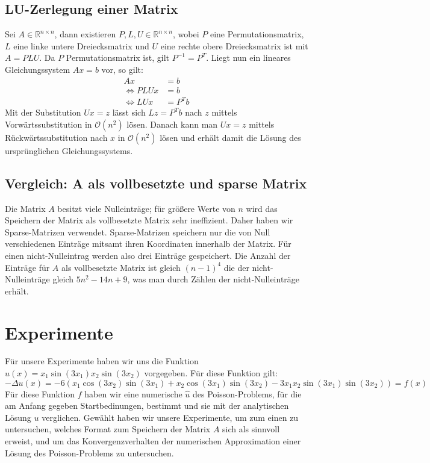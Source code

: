 \documentclass{scrartcl}
\theoremstyle{remark}
\begin{document}
\subsection{LU-Zerlegung einer Matrix}
Sei \(A \in \mathbb{R}^{n \times n}\), dann existieren \(P, L, U \in \mathbb{R}^{n \times n}\), 
wobei \(P\) eine Permutationsmatrix, \(L\) eine linke untere Dreiecksmatrix und \(U\) eine rechte obere
Dreiecksmatrix ist mit \(A = PLU\).  \cite{LU}
Da \(P\) Permutationsmatrix ist, gilt \(P^{-1} = P^T\).
Liegt nun ein lineares Gleichungssystem \(Ax = b\) vor, so gilt:
\begin{align*}
  Ax &= b \\
  \iff PLUx &= b \\
  \iff LUx  &= P^{T}b
\end{align*}
Mit der Substitution \(Ux = z\) lässt sich \(Lz = P^{T}b\) nach \(z\) mittels Vorwärtssubstitution in \(\mathcal{O}(n^{2})\) lösen.
Danach kann man \(Ux = z\) mittels Rückwärtssubstitution nach \(x\) in \(\mathcal{O}(n^{2})\) lösen und erhält damit die Lösung des
ursprünglichen Gleichungssystems.

\subsection{Vergleich: A als vollbesetzte und sparse Matrix}
Die Matrix \(A\) besitzt viele Nulleinträge; für größere Werte von \(n\) wird das Speichern
der Matrix als vollbesetzte Matrix sehr ineffizient. Daher haben wir Sparse-Matrizen verwendet.
Sparse-Matrizen speichern nur die von Null verschiedenen Einträge mitsamt ihren Koordinaten innerhalb 
der Matrix. Für einen nicht-Nulleintrag werden also drei Einträge gespeichert.
Die Anzahl der Einträge für \(A\) als vollbesetzte Matrix ist gleich \((n - 1)^4\)
die der nicht-Nulleinträge gleich \(5n^2 - 14n + 9\), was man durch Zählen der nicht-Nulleinträge erhält.



\section{Experimente}
Für unsere Experimente haben wir uns die Funktion \(u(x) = x_{1}\sin(3x_{1})x_{2}\sin(3x_{2})\) vorgegeben. Für diese Funktion gilt:
\[-\Delta u(x) = -6(x_{1}\cos(3x_{2})\sin(3x_{1}) + x_{2}\cos(3x_{1})\sin(3x_{2}) - 3x_{1}x_{2}\sin(3x_{1})\sin(3x_{2})) = f(x)\] 
Für diese Funktion \(f\) haben wir eine numerische \(\hat{u}\) des Poisson-Problems, für die am Anfang gegeben Startbedinungen, bestimmt und sie 
mit der analytischen Lösung \(u\) verglichen. Gewählt haben wir unsere Experimente, um zum einen zu untersuchen, welches Format zum Speichern
der Matrix \(A\) sich als sinnvoll erweist, und um das Konvergenzverhalten der numerischen Approximation einer Lösung des Poisson-Problems zu 
untersuchen.
\end{document}
